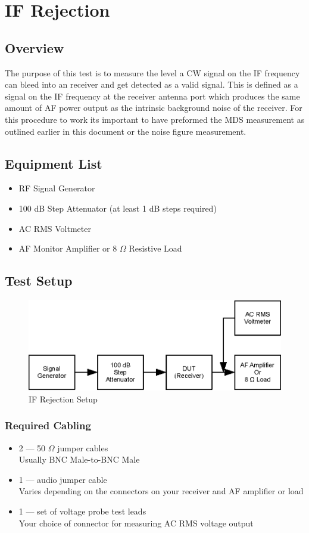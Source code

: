 \documentclass[10pt,letterpaper]{book}
\begin{document}
\section{IF Rejection}

\subsection*{Overview}
The purpose of this test is to measure the level a CW signal on the IF frequency can bleed into an receiver and get detected as a valid signal. This is defined as a signal on the IF frequency at the receiver antenna port which produces the same amount of AF power output as the intrinsic background noise of the receiver.  For this procedure to work its important to have preformed the MDS measurement as outlined earlier in this document or the noise figure measurement. 
\subsection*{Equipment List}
\begin{itemize}
	\item RF Signal Generator
	\item 100 dB Step Attenuator (at least 1 dB steps required)
	\item AC RMS Voltmeter%
	\item AF Monitor Amplifier or 8 $\Omega$ Resistive Load
\end{itemize}
\subsection*{Test Setup}
\begin{figure}
\centering
\includegraphics[scale=1]{Illustrations/MDSSetup}
\caption{IF Rejection Setup}
\end{figure}
\subsubsection*{Required Cabling}
\begin{itemize}
	\item 2 --- 50 $\Omega$ jumper cables \\
		Usually BNC Male-to-BNC Male
	\item 1 --- audio jumper cable \\
		Varies depending on the connectors on your receiver and AF amplifier or load
	\item 1 --- set of voltage probe test leads \\
		Your choice of connector for measuring AC RMS voltage output
\end{itemize}
\end{document}
